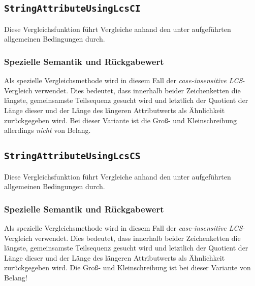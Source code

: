 %
%
\subsection{\texttt{StringAttributeUsingLcsCI}}
Diese Vergleichsfunktion führt Vergleiche anhand den unter  aufgeführten allgemeinen Bedingungen durch.

\subsubsection*{Spezielle Semantik und Rückgabewert}
Als spezielle Vergleichsmethode wird in diesem Fall der \emph{case-insensitive LCS}-Vergleich verwendet. Dies bedeutet, dass innerhalb beider Zeichenketten die längste, gemeinsamste Teilsequenz gesucht wird und letztlich der Quotient der Länge dieser und der Länge des längeren Attributwerts als Ähnlichkeit zurückgegeben wird. Bei dieser Variante ist die Groß- und Kleinschreibung allerdings \emph{nicht} von Belang.

%
%
\subsection{\texttt{StringAttributeUsingLcsCS}}
Diese Vergleichsfunktion führt Vergleiche anhand den unter  aufgeführten allgemeinen Bedingungen durch.

\subsubsection*{Spezielle Semantik und Rückgabewert}
Als spezielle Vergleichsmethode wird in diesem Fall der \emph{case-insensitive LCS}-Vergleich verwendet. Dies bedeutet, dass innerhalb beider Zeichenketten die längste, gemeinsamste Teilsequenz gesucht wird und letztlich der Quotient der Länge dieser und der Länge des längeren Attributwerts als Ähnlichkeit zurückgegeben wird. Die Groß- und Kleinschreibung ist bei dieser Variante von Belang!